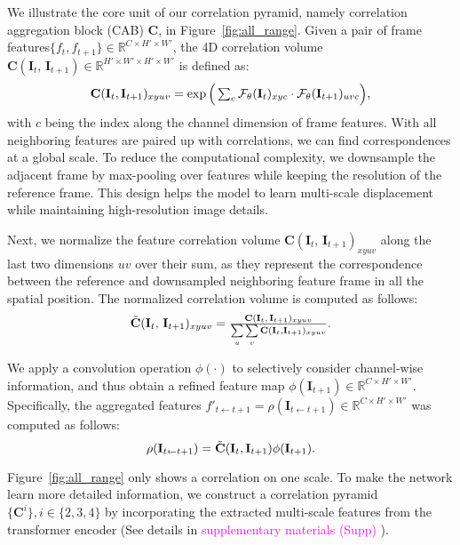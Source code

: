 \documentclass[10pt,twocolumn,letterpaper]{article}
\newcommand{\supp}[1]{\textcolor{magenta}{#1}}
\def\figref#1{Figure~\ref{#1}}
\begin{document}
We illustrate the core unit of our correlation pyramid, namely correlation aggregation block (CAB) $\mathbf{C}$, in \figref{fig:all_range}.
Given a pair of frame features$\{ f_{t}, f_{t+1} \} \in  \mathbb{R}^{C \times H' \times W'}$, the 4D correlation volume $\mathbf{C}(\mathbf{I}_t,\,\mathbf{I}_{t+1}) \in \mathbb{R}^{ H' \times W' \times H' \times W' }$ is defined as:
\begin{equation}
\small
\textstyle{
 \mathbf{C}(\mathbf{I}_t,\mathbf{I}_{t+1})_{xyuv} = \exp\Big(\sum_{c} \mathcal{F}_\theta(\mathbf{I}_{t})_{xyc} \cdot \mathcal{F}_\theta(\mathbf{I}_{t+1})_{uvc}\Big),
 \label{ag:correlation}
}
\end{equation}
with $c$ being the index along the channel dimension of frame features. With all neighboring features are paired up with correlations, we can find correspondences at a global scale. To reduce the computational complexity, 
we downsample the adjacent frame by max-pooling over features while keeping the resolution of the reference frame. This design helps the model to learn multi-scale displacement while maintaining high-resolution image details. 

Next, we normalize the feature correlation volume $\mathbf{C}(\mathbf{I}_t,\,\mathbf{I}_{t+1})_{xyuv}$ along the last two dimensions $uv$ over their sum, as they represent the correspondence between the reference and downsampled neighboring feature frame in all the spatial position. The normalized correlation volume is computed as follows:
\begin{equation}
\textstyle{
    \Tilde{\mathbf{C}}(\mathbf{I}_t,\,\mathbf{I}_{t+1})_{xyuv} = \frac{\mathbf{C}(\mathbf{I}_t,\,\mathbf{I}_{t+1})_{xyuv}}
    {\sum\limits_u\sum\limits_v{\mathbf{C}}(\mathbf{I}_t,\mathbf{I}_{t+1})_{xyuv}}.
}
\end{equation}

We apply a convolution operation $\phi(\cdot)$ to selectively consider channel-wise information, and thus obtain a refined feature map $\phi(\mathbf{I}_{t+1}) \in\mathbb{R}^{C \times H' \times W'}$. Specifically, the aggregated features $f'_{t\leftarrow t+1}= \rho (\mathbf{I}_{t\leftarrow t+1})\in\mathbb{R}^{C \times H' \times W'}$ was computed as follows:
\begin{equation}
\rho(\mathbf{I}_{t\leftarrow t+1})=\Tilde{\mathbf{C}}(\mathbf{I}_t,\mathbf{I}_{t+1})\phi(\mathbf{I}_{t+1}).
\end{equation}

\figref{fig:all_range} only shows a correlation on one scale. To make the network learn more detailed information, we construct a correlation pyramid $\{\mathbf{C}^{i}\}, i \in \{2, 3, 4\}$ by incorporating the extracted multi-scale features from the transformer encoder (See details in \supp{supplementary materials (Supp)} ). 
\end{document}
